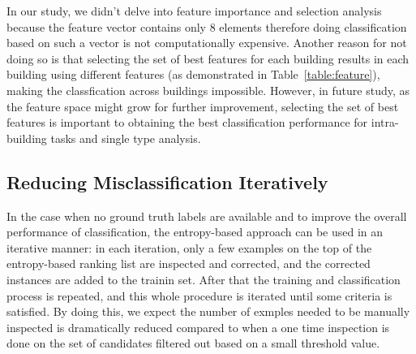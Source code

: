 In our study, we didn't delve into feature importance and selection analysis because the feature vector contains only 8 elements therefore doing classification based on such a vector is not computationally expensive. Another reason for not doing so is that selecting the set of best features for each building results in each building using different features (as demonstrated in Table~\ref{table:feature}), making the classfication across buildings impossible. However, in future study, as the feature space might grow for further
improvement, selecting the set of best features is important to obtaining the best classification performance for intra-building tasks and single type analysis.

\subsection{Reducing Misclassification Iteratively}
In the case when no ground truth labels are available and to improve the overall performance of classification, the entropy-based approach can be used in an iterative manner: in each iteration, only a few examples on the top of the entropy-based ranking list are inspected and corrected, and the corrected instances are added to the trainin set. After that the training and classification process is repeated, and this whole procedure is iterated until some criteria is satisfied.
By doing this, we expect the number of exmples needed to be manually inspected is dramatically reduced compared to when a one time inspection is done on the set of candidates filtered out based on a small threshold value.
